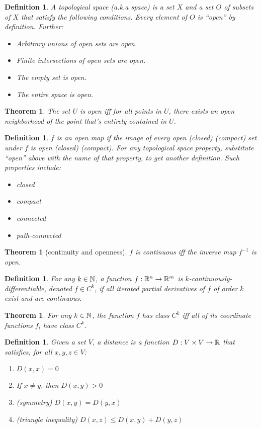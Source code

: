 \documentclass[11pt,leqno,oneside]{amsart}
\theoremstyle{mystyle} \newtheorem{thrm}[thm]{Theorem}
\theoremstyle{mystyle} \newtheorem{defi}[thm]{Definition}
\begin{document}
\begin{defi}
	A \emph{topological space} (a.k.a \emph{space}) is a set $X$ and a set $O$ of subsets of $X$ that satisfy the following conditions.  Every element of $O$ is ``open'' by definition.  Further:
	\begin{itemize}
		\item Arbitrary unions of open sets are open.
		\item Finite intersections of open sets are open.
		\item The empty set is open.
		\item The entire space is open.
	\end{itemize}
\end{defi}
\begin{thrm}
	The set $U$ is open iff for all points in $U$, there exists an open neighborhood of the point that's entirely contained in $U$.
\end{thrm}
\begin{defi}
	$f$ is an \emph{open} map if the image of every open (closed) (compact) set under $f$ is open (closed) (compact).
	For any topological space property, substitute ``open'' above with the name of that property, to get another definition.  Such properties include:
	\begin{itemize}
		\item closed
		\item compact
		\item connected
		\item path-connected
	\end{itemize}
\end{defi}
\begin{thrm}[continuity and openness]
	$f$ is continuous iff the inverse map $f^{-1}$ is open.
\end{thrm}
\begin{defi}
	For any $k \in {\mathbb N}$, a function $f:{\mathbb R}^n \to {\mathbb R}^m$ is \emph{$k$-continuously-differentiable}, denoted $f \in C^k$, if all iterated partial derivatives of $f$ of order $k$ exist and are continuous.
\end{defi}
\begin{thrm}
	For any $k \in {\mathbb N}$, the function $f$ has class $C^k$ iff all of its coordinate functions $f_i$ have class $C^k$.
\end{thrm}
\begin{defi}
	Given a set $V$, a \emph{distance} is a function $D : V \times V \to {\mathbb R}$ that satisfies, for all $x, y, z \in V$:
	\begin{enumerate}
		\item $D(x,x) = 0$
		\item If $x \neq y$, then $D(x,y) > 0$
		\item (symmetry) $D(x,y) = D(y,x)$
		\item (triangle inequality) $D(x,z) \leq D(x,y) + D(y,z)$
	\end{enumerate}
\end{defi}
\end{document}
